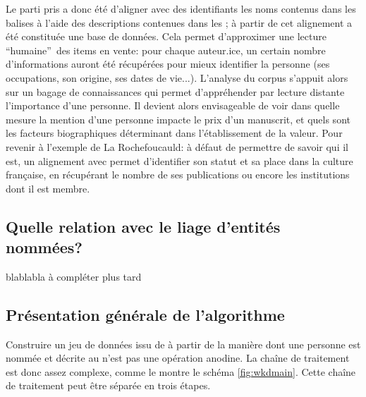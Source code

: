 Le parti pris a donc été d'aligner avec des identifiants \wkd{} les noms contenus dans les balises \tname{} à l'aide des descriptions contenues dans les \ttrait{}; à partir de cet alignement a été constituée une base de données. Cela permet d'approximer une lecture \enquote{humaine} des items en vente: pour chaque auteur.ice, un certain nombre d'informations auront été récupérées pour mieux identifier la personne (ses occupations, son origine, ses dates de vie...). L'analyse du corpus s'appuit alors sur un bagage de connaissances qui permet d'appréhender par lecture distante l'importance d'une personne. Il devient alors envisageable de voir dans quelle mesure la mention d'une personne impacte le prix d'un manuscrit, et quels sont les facteurs biographiques déterminant dans l'établissement de la valeur. Pour revenir à l'exemple de La Rochefoucauld: à défaut de permettre de savoir qui il est, un alignement avec \wkd{} permet d'identifier son statut et sa place dans la culture française, en récupérant le nombre de ses publications ou encore les institutions dont il est membre.

\subsection{Quelle relation avec le liage d'entités nommées?}
blablabla à compléter plus tard

\subsection{Présentation générale de l'algorithme}
Construire un jeu de données issu de \sparql{} à partir de la manière dont une personne est nommée et décrite au  n'est pas une opération anodine. La chaîne de traitement est donc assez complexe, comme le montre le schéma \ref{fig:wkdmain}. Cette chaîne de traitement peut être séparée en trois étapes.

